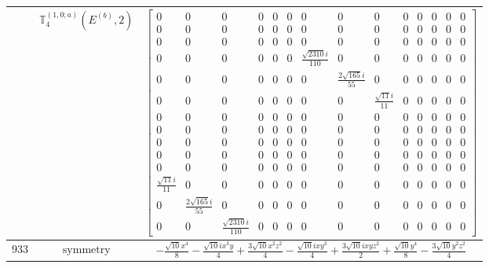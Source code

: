 \documentclass[fleqn,8pt,landscape]{jsarticle}
\begin{document}
\begin{longtable}{ccc}
$  $ & $ \mathbb{T}_{4}^{(1,0;a)}(E^{(b)},2) $ & $ \begin{bmatrix} 0 & 0 & 0 & 0 & 0 & 0 & 0 & 0 & 0 & 0 & 0 & 0 & 0 & 0 \\ 0 & 0 & 0 & 0 & 0 & 0 & 0 & 0 & 0 & 0 & 0 & 0 & 0 & 0 \\ 0 & 0 & 0 & 0 & 0 & 0 & 0 & 0 & 0 & 0 & 0 & 0 & 0 & 0 \\ 0 & 0 & 0 & 0 & 0 & 0 & \frac{\sqrt{2310} i}{110} & 0 & 0 & 0 & 0 & 0 & 0 & 0 \\ 0 & 0 & 0 & 0 & 0 & 0 & 0 & \frac{2 \sqrt{165} i}{55} & 0 & 0 & 0 & 0 & 0 & 0 \\ 0 & 0 & 0 & 0 & 0 & 0 & 0 & 0 & \frac{\sqrt{11} i}{11} & 0 & 0 & 0 & 0 & 0 \\ 0 & 0 & 0 & 0 & 0 & 0 & 0 & 0 & 0 & 0 & 0 & 0 & 0 & 0 \\ 0 & 0 & 0 & 0 & 0 & 0 & 0 & 0 & 0 & 0 & 0 & 0 & 0 & 0 \\ 0 & 0 & 0 & 0 & 0 & 0 & 0 & 0 & 0 & 0 & 0 & 0 & 0 & 0 \\ 0 & 0 & 0 & 0 & 0 & 0 & 0 & 0 & 0 & 0 & 0 & 0 & 0 & 0 \\ 0 & 0 & 0 & 0 & 0 & 0 & 0 & 0 & 0 & 0 & 0 & 0 & 0 & 0 \\ \frac{\sqrt{11} i}{11} & 0 & 0 & 0 & 0 & 0 & 0 & 0 & 0 & 0 & 0 & 0 & 0 & 0 \\ 0 & \frac{2 \sqrt{165} i}{55} & 0 & 0 & 0 & 0 & 0 & 0 & 0 & 0 & 0 & 0 & 0 & 0 \\ 0 & 0 & \frac{\sqrt{2310} i}{110} & 0 & 0 & 0 & 0 & 0 & 0 & 0 & 0 & 0 & 0 & 0 \end{bmatrix} $ \\ \hline
$ 933 $ & $ \text{symmetry} $ & $ - \frac{\sqrt{10} x^{4}}{8} - \frac{\sqrt{10} i x^{3} y}{4} + \frac{3 \sqrt{10} x^{2} z^{2}}{4} - \frac{\sqrt{10} i x y^{3}}{4} + \frac{3 \sqrt{10} i x y z^{2}}{2} + \frac{\sqrt{10} y^{4}}{8} - \frac{3 \sqrt{10} y^{2} z^{2}}{4} $ \\

\end{longtable}
\end{document}
